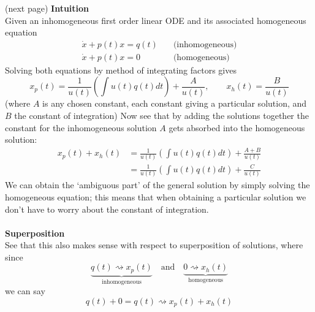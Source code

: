 \documentclass{report}
\begin{document}
(next page)
\newpage
\noindent\textbf{Intuition}\\
Given an inhomogeneous first order linear ODE and its associated homogeneous equation
\begin{align*}
\dot{x}+p(t)x=q(t)\quad&\text{(inhomogeneous)}\\
\dot{x}+p(t)x=0\quad&\text{(homogeneous)}
\end{align*}
Solving both equations by method of integrating factors gives
\begin{equation*}
x_p(t)=\frac{1}{u(t)}\left(\int u(t)q(t)dt\right)+\frac{A}{u(t)},\qquad
x_h(t)=\frac{B}{u(t)}
\end{equation*}
(where $A$ is any chosen constant, each constant giving a particular solution, and $B$ the constant of integration)
Now see that by adding the solutions together the constant for the inhomogeneous solution $A$ gets absorbed into
the homogeneous solution:
\begin{align*}
x_p(t)+x_h(t)&=\frac{1}{u(t)}\left(\int u(t)q(t)dt\right)+\frac{A+B}{u(t)}\\
&=\frac{1}{u(t)}\left(\int u(t)q(t)dt\right)+\frac{C}{u(t)}
\end{align*}
We can obtain the `ambiguous part' of the general solution by simply solving the homogeneous equation; this means
that when obtaining a particular solution we don't have to worry about the constant of integration.\\
\vspace{1mm}\\
\textbf{Superposition}\\
See that this also makes sense with respect to superposition of solutions, where since
\begin{equation*}
\underbrace{q(t)\rightsquigarrow x_p(t)}_{\text{inhomogeneous}}\quad\text{and}\quad
\underbrace{0\rightsquigarrow x_h(t)}_{\text{homogeneous}}
\end{equation*}
we can say
\begin{equation*}
q(t)+0=q(t)\rightsquigarrow x_p(t)+x_h(t)
\end{equation*}
\newpage
\end{document}
